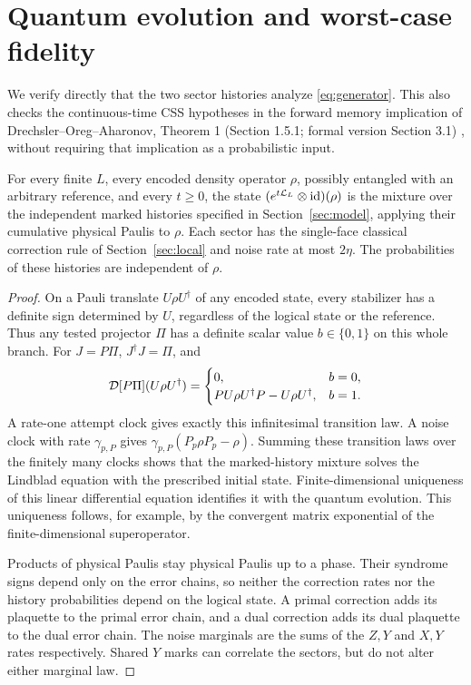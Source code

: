 \section{Quantum evolution and worst-case fidelity}\label{sec:quantum}

We verify directly that the two sector histories analyze
\eqref{eq:generator}. This also checks the continuous-time CSS
hypotheses in the forward memory implication of
Drechsler--Oreg--Aharonov, Theorem 1 (Section 1.5.1; formal version Section 3.1) \cite{DOA}, without requiring that
implication as a probabilistic input.

\begin{lemma}\label{lem:trajectories}
For every finite \(L\), every encoded density operator \(\rho\),
possibly entangled with an arbitrary reference, and every \(t\ge0\),
the state \((e^{t\mathcal L_L}\otimes\operatorname{id})(\rho)\) is the mixture over the
independent marked histories specified in
Section~\ref{sec:model}, applying their cumulative physical Paulis
to \(\rho\). Each sector has the single-face classical correction
rule of Section~\ref{sec:local} and noise rate at most \(2\eta\).
The probabilities of these histories are independent of \(\rho\).
\end{lemma}
\begin{proof}
On a Pauli translate \(U\rho U^\dagger\) of any encoded state, every
stabilizer has a definite sign determined by \(U\), regardless of
the logical state or the reference. Thus any tested projector
\(\Pi\) has a definite scalar value \(b\in\{0,1\}\) on this whole
branch. For \(J=P\Pi\), \(J^\dagger J=\Pi\), and
\[
 \mathcal D[P\Pi](U\rho U^\dagger)=
 \begin{cases}
 0,&b=0,\\
 P U\rho U^\dagger P-U\rho U^\dagger,&b=1.
 \end{cases}
\]
A rate-one attempt clock gives exactly this infinitesimal transition
law. A noise clock with rate \(\gamma_{p,P}\) gives
\(\gamma_{p,P}(P_p\rho P_p-\rho)\).
Summing these transition laws over the finitely many clocks shows
that the marked-history mixture solves the Lindblad equation with
the prescribed initial state. Finite-dimensional uniqueness of
this linear differential equation identifies it with the quantum
evolution. This uniqueness follows, for example, by the convergent
matrix exponential of the finite-dimensional superoperator.

Products of physical Paulis stay physical Paulis up to a phase.
Their syndrome signs depend only on the error chains, so neither
the correction rates nor the history probabilities depend on the
logical state. A primal correction adds its plaquette to the
primal error chain, and a dual correction adds its dual plaquette
to the dual error chain. The noise marginals are the sums of the
\(Z,Y\) and \(X,Y\) rates respectively. Shared \(Y\) marks can
correlate the sectors, but do not alter either marginal law.
\end{proof}

